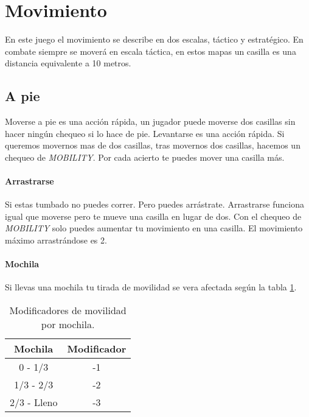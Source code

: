 \section{Movimiento}
    En este juego el movimiento se describe en dos escalas, táctico y estratégico. En combate siempre se moverá en escala táctica, en estos mapas un casilla es una distancia equivalente a 10 metros.

    \subsection{A pie}
        Moverse a pie es una acción rápida, un jugador puede moverse dos casillas sin hacer ningún chequeo si lo hace de pie.
        Levantarse es una acción rápida. Si queremos movernos mas de dos casillas, tras movernos dos casillas, hacemos un chequeo de \emph{MOBILITY}.
        Por cada acierto te puedes mover una casilla más.

        \paragraph{Arrastrarse}
        Si estas tumbado no puedes correr. Pero puedes arrástrate. Arrastrarse funciona igual que moverse pero te mueve una casilla en lugar de dos.
        Con el chequeo de \emph{MOBILITY} solo puedes aumentar tu movimiento en una casilla. El movimiento máximo arrastrándose es 2.

        \paragraph{Mochila}
        Si llevas una mochila tu tirada de movilidad se vera afectada según la tabla \ref{table:1}.

        \begin{table}
            \centering
            \begin{tabular}{ c c }
                \hline
                Mochila & Modificador \\
                \hline
                0 - 1/3 & -1 \\
                1/3 - 2/3 & -2 \\
                2/3 - Lleno & -3 \\
                \hline
            \end{tabular}
            \caption{Modificadores de movilidad por mochila.}
            \label{table:1}
        \end{table}

